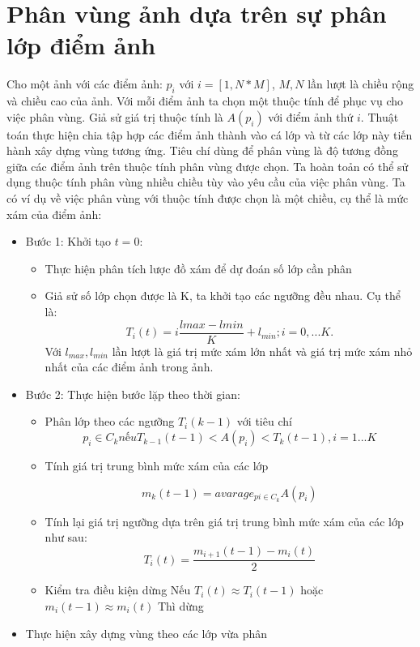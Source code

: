 \documentclass[12pt,oneside,a4]{report}
\begin{document}
\section{Phân vùng ảnh dựa trên sự phân lớp điểm ảnh}
Cho một ảnh với các điểm ảnh: $p_{i}$ với $i=[1,N*M]$, $M,N$ lần lượt là chiều rộng và chiều cao của ảnh. Với mỗi điểm ảnh ta chọn một thuộc tính để phục vụ cho việc phân vùng. Giả sử giá trị thuộc tính là $A(p_{i})$ với điểm ảnh thứ $i$. Thuật toán thực hiện chia tập hợp các điểm ảnh thành vào cá lớp và từ các lớp này tiến hành xây dựng vùng tương ứng. Tiêu chí dùng để phân vùng là độ tương đồng giữa các điểm ảnh trên thuộc tính phân vùng được chọn. Ta hoàn toản có thể sử dụng thuộc tính phân vùng nhiều chiều tùy vào yêu cầu của việc phân vùng.
Ta có ví dụ về việc phân vùng với thuộc tính được chọn là một chiều, cụ thể là mức xám của điểm ảnh:
\begin{itemize}
\item Bước 1:
Khởi tạo $t=0$:
\begin{itemize}
\item Thực hiện phân tích lược đồ xám để dự đoán số lớp cần phân
\item Giả sử số lớp chọn được là K, ta khởi tạo các ngưỡng đều nhau. Cụ thể là:
\begin{equation}
T_i(t)=i\dfrac{lmax-lmin}{K}+l_{min}; i=0,...K. 
\end{equation}
Với $l_{max},l_{min}$ lần lượt là giá trị mức xám lớn nhất và giá trị mức xám nhỏ nhất của các điểm ảnh trong ảnh.
\end{itemize}
\item Bước 2: Thực hiện bước lặp theo thời gian:
\begin{itemize}
\item Phân lớp theo các ngưỡng $T_i(k-1)$ với tiêu chí
\begin{equation}
p_i\in C_k nếu T_{k-1}(t-1)<A(p_i)<T_{k}(t-1), i=1...K
\end{equation}
\item Tính giá trị trung bình mức xám của các lớp 

\begin{equation}
m_k(t-1)= avarage_{pi\in C_k}A(p_i)
\end{equation}
\item Tính lại giá trị ngưỡng dựa trên giá trị trung bình mức xám của các lớp như sau:
\begin{equation}
T_i(t)=\dfrac{m_{i+1}(t-1)-m_{i}(t)}{2}
\end{equation}
\item Kiểm tra điều kiện dừng
Nếu $T_i(t)\approx T_i(t-1)$ hoặc $m_{i}(t-1)\approx m_{i}(t)$ Thì dừng
\end{itemize}
\item Thực hiện xây dựng vùng theo các lớp vừa phân
\end{itemize}
\end{document}
